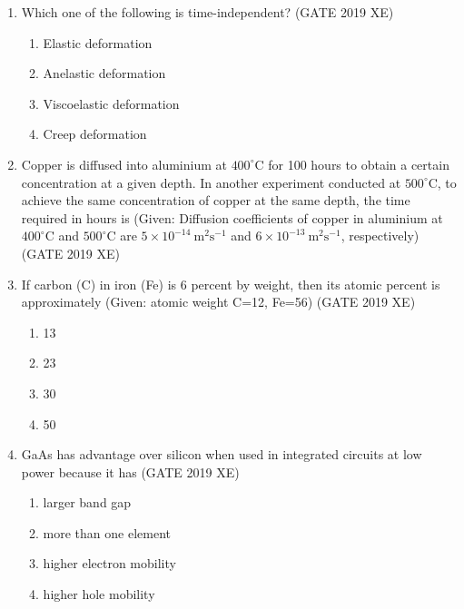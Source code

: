 \documentclass[journal,12pt,onecolumn]{IEEEtran}
\begin{document}
\begin{enumerate}
\item Which one of the following is time-independent?
\hfill{(GATE 2019 XE)} \\
\begin{multicols}{2}
\begin{enumerate}
\item Elastic deformation
\item Anelastic deformation
\item Viscoelastic deformation
\item Creep deformation
\end{enumerate}
\end{multicols}

\item Copper is diffused into aluminium at $400^\circ$C for 100 hours to obtain a certain concentration at a given depth. In another experiment conducted at $500^\circ$C, to achieve the same concentration of copper at the same depth, the time required in hours is (Given: Diffusion coefficients of copper in aluminium at $400^\circ$C and $500^\circ$C are $5\times10^{-14}\ \mathrm{m^2 s^{-1}}$ and $6\times10^{-13}\ \mathrm{m^2 s^{-1}}$, respectively)
\hfill{(GATE 2019 XE)} \\


\item If carbon (C) in iron (Fe) is 6 percent by weight, then its atomic percent is approximately (Given: atomic weight C=12, Fe=56)
\hfill{(GATE 2019 XE)} \\
\begin{multicols}{2}
\begin{enumerate}
\item 13
\item 23
\item 30
\item 50
\end{enumerate}
\end{multicols}

\item GaAs has advantage over silicon when used in integrated circuits at low power because it has
\hfill{(GATE 2019 XE)} \\
\begin{multicols}{2}
\begin{enumerate}
\item larger band gap
\item more than one element
\item higher electron mobility
\item higher hole mobility
\end{enumerate}
\end{multicols}



\end{enumerate}
\end{document}
